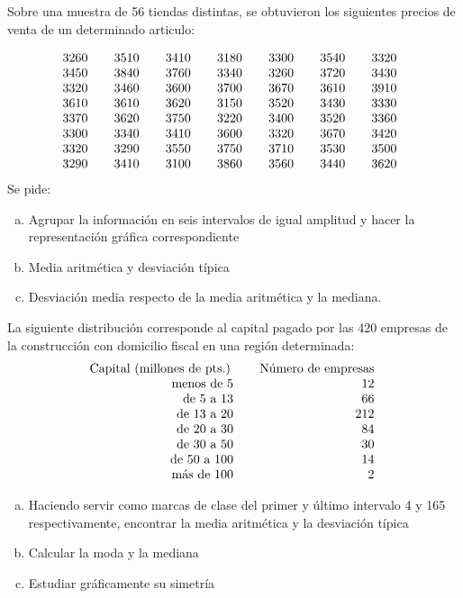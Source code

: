 \documentclass[12pt]{article}
\begin{document}
\begin{prob}Sobre una muestra de 56 tiendas distintas, se obtuvieron
los siguientes precios de venta de un determinado articulo:

$$
\vbox{\halign{\offinterlineskip\strut\hskip0.25cm # \hskip0.25cm& \hskip0.25cm #
\hskip0.25cm&\hskip0.25cm # \hskip0.25cm& \hskip0.25cm # \hskip0.25cm&\hskip0.25cm #
\hskip0.25cm& \hskip0.25cm # \hskip0.25cm&\hskip0.25cm # \hskip0.25cm\cr
 3260 & 3510 & 3410 & 3180 & 3300 & 3540 & 3320 \cr
3450 & 3840 & 3760 & 3340 & 3260 & 3720 & 3430 \cr 3320 & 3460 & 3600 & 3700 & 3670 &
3610 & 3910 \cr 3610 & 3610 & 3620 & 3150 & 3520 & 3430 & 3330 \cr 3370 & 3620 & 3750 &
3220 & 3400 & 3520 & 3360 \cr 3300 & 3340 & 3410 & 3600 & 3320 & 3670 & 3420 \cr 3320 &
3290 & 3550 & 3750 & 3710 & 3530 & 3500 \cr 3290 & 3410 & 3100 & 3860 & 3560 & 3440 &
3620 \cr }}
$$
Se pide:
\begin{enumerate}[a)]
\item {Agrupar la información en seis intervalos de igual
amplitud y hacer la representación gráfica correspondiente}
\item {Media aritmética y desviación típica}
\item {Desviación media respecto de la media aritmética y la
mediana.}
\end{enumerate}
\end{prob}

\begin{prob} La siguiente  distribución corresponde al capital
pagado por las 420 empresas de la construcción con domicilio fiscal en una región
determinada:
$$\vbox{\halign{\offinterlineskip\strut\hskip0.25cm \hfill #
\hskip0.25cm& \hskip0.25cm \hfill # \hskip0.25cm\cr
 Capital (millones de pts.) & Número de empresas\cr
 menos de 5 &12\cr
 de 5 a 13 &66\cr
 de 13 a 20 &212\cr
 de 20 a 30 &84\cr
 de 30 a 50 &30\cr
 de 50 a 100 &14\cr
 más de 100 &2\cr}}
$$
\begin{enumerate}[a)]
\item{Haciendo  servir como  marcas de clase del primer y
último intervalo 4 y 165 respectivamente, encontrar la media aritmética y la desviación
típica}
\item {Calcular la moda y la mediana}
\item {Estudiar gráficamente su simetría}
\end{enumerate}
\end{prob}
\end{document}
